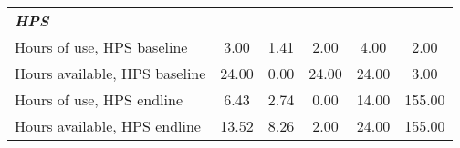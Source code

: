 \begin{table}[htbp]
\begin{tabular}{l*{1}{ccccc}}
\textbf{\emph{HPS}} &            &            &            &            &            \\
Hours of use, HPS baseline&        3.00&        1.41&        2.00&        4.00&        2.00\\
Hours available, HPS baseline&       24.00&        0.00&       24.00&       24.00&        3.00\\
Hours of use, HPS endline&        6.43&        2.74&        0.00&       14.00&      155.00\\
Hours available, HPS endline&       13.52&        8.26&        2.00&       24.00&      155.00\\
\bottomrule
\end{tabular}
\end{table}
